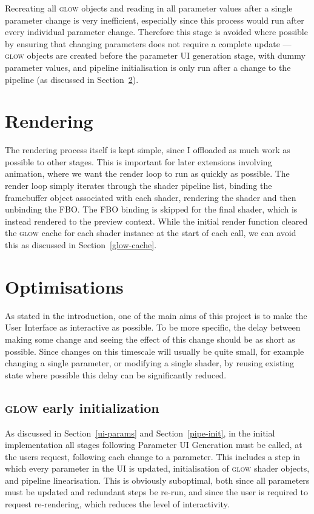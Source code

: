 \documentclass[12pt,twoside,notitlepage]{report}
\begin{document}
Recreating all \textsc{glow} objects and reading in all parameter values after a single parameter change is very inefficient, especially since this process would run after every individual parameter change. Therefore this stage is avoided where possible by ensuring that changing parameters does not require a complete update --- \textsc{glow} objects are created before the parameter UI generation stage, with dummy parameter values, and pipeline initialisation is only run after a change to the pipeline (as discussed in Section~\ref{opt}).

\section{Rendering}
The rendering process itself is kept simple, since I offloaded as much work as possible to other stages. This is important for later extensions involving animation, where we want the render loop to run as quickly as possible. The render loop simply iterates through the shader pipeline list, binding the framebuffer object associated with each shader, rendering the shader and then unbinding the FBO. The FBO binding is skipped for the final shader, which is instead rendered to the preview context. While the initial render function cleared the \textsc{glow} cache for each shader instance at the start of each call, we can avoid this as discussed in Section~\ref{glow-cache}.

\clearpage
\section{Optimisations}
\label{opt}
As stated in the introduction, one of the main aims of this project is to make the User Interface as interactive as possible. To be more specific, the delay between making some change and seeing the effect of this change should be as short as possible. Since changes on this timescale will usually be quite small, for example changing a single parameter, or modifying a single shader, by reusing existing state where possible this delay can be significantly reduced.

\subsection{\textsc{glow} early initialization}
As discussed in Section~\ref{ui-params} and Section~\ref{pipe-init}, in the initial implementation all stages following Parameter UI Generation must be called, at the users request, following each change to a parameter. This includes a step in which every parameter in the UI is updated, initialisation of \textsc{glow} shader objects, and pipeline linearisation. This is obviously suboptimal, both since all parameters must be updated and redundant steps be re-run, and since the user is required to request re-rendering, which reduces the level of interactivity.
\end{document}
